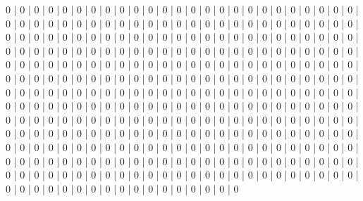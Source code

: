 \documentclass[parskip=half]{scrartcl}
\begin{document}
0 | 0 | 0 | 0 | 0 | 0 | 0 | 0 | 0 | 0 | 0 | 0 | 0 | 0 | 0 | 0 | 0 | 0 | 0 | 0 | 0 | 0 | 0 | 0 | 0 | 0 | 0 | 0 | 0 | 0 | 0 | 0 | 0 | 0 | 0 | 0 | 0 | 0 | 0 | 0 | 0 | 0 | 0 | 0 | 0 | 0 | 0 | 0 | 0 | 0 | 0 | 0 | 0 | 0 | 0 | 0 | 0 | 0 | 0 | 0 | 0 | 0 | 0 | 0 | 0 | 0 | 0 | 0 | 0 | 0 | 0 | 0 | 0 | 0 | 0 | 0 | 0 | 0 | 0 | 0 | 0 | 0 | 0 | 0 | 0 | 0 | 0 | 0 | 0 | 0 | 0 | 0 | 0 | 0 | 0 | 0 | 0 | 0 | 0 | 0 | 0 | 0 | 0 | 0 | 0 | 0 | 0 | 0 | 0 | 0 | 0 | 0 | 0 | 0 | 0 | 0 | 0 | 0 | 0 | 0 | 0 | 0 | 0 | 0 | 0 | 0 | 0 | 0 | 0 | 0 | 0 | 0 | 0 | 0 | 0 | 0 | 0 | 0 | 0 | 0 | 0 | 0 | 0 | 0 | 0 | 0 | 0 | 0 | 0 | 0 | 0 | 0 | 0 | 0 | 0 | 0 | 0 | 0 | 0 | 0 | 0 | 0 | 0 | 0 | 0 | 0 | 0 | 0 | 0 | 0 | 0 | 0 | 0 | 0 | 0 | 0 | 0 | 0 | 0 | 0 | 0 | 0 | 0 | 0 | 0 | 0 | 0 | 0 | 0 | 0 | 0 | 0 | 0 | 0 | 0 | 0 | 0 | 0 | 0 | 0 | 0 | 0 | 0 | 0 | 0 | 0 | 0 | 0 | 0 | 0 | 0 | 0 | 0 | 0 | 0 | 0 | 0 | 0 | 0 | 0 | 0 | 0 | 0 | 0 | 0 | 0 | 0 | 0 | 0 | 0 | 0 | 0 | 0 | 0 | 0 | 0 | 0 | 0 | 0 | 0 | 0 | 0 | 0 | 0 | 0 | 0 | 0 | 0 | 0 | 0 | 0 | 0 | 0 | 0 | 0 | 0 | 0 | 0 | 0 | 0 | 0 | 0 | 0 | 0 | 0 | 0 | 0 | 0 | 0 | 0 | 0 | 0 | 0 | 0 | 0 | 0 | 0 | 0 | 0 | 0 | 0 | 0 | 0 | 0 | 0 | 0 | 0 | 0 | 0 | 0 | 0 | 0 | 0 | 0 | 0 | 0 | 0 | 0 | 0 | 0 | 0 | 0 | 0 | 0 | 0 | 0 | 0 | 0 | 0 | 0 | 0 | 0 | 0 | 0 | 0 | 0 | 0 | 0 | 0 | 0 | 0 | 0 | 0 | 0 | 0 | 0 | 0 | 0 | 0 | 0 | 0 | 0 | 0 | 0 | 0 | 0 | 0 | 0 | 0 | 0 | 0 | 0\\
\end{document}
